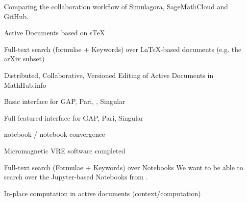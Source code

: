 \begin{workpackage}
\begin{tasklist}
\begin{task}[id=simulagora,title=Simulagora collaboration,lead=LL,PM=2]
  Comparing the collaboration workflow of Simulagora, SageMathCloud and GitHub.
\end{task}

\end{tasklist}

\begin{wpdelivs}
  \begin{wpdeliv}[id=adstex,due=6,nature=R,dissem=PU,lead=JU]
    {Active Documents based on sTeX}
  \end{wpdeliv}
    \begin{wpdeliv}[id=mws,due=9,nature=OTHER,dissem=PU,lead=JU]
      {Full-text search (formulae + Keywords) over LaTeX-based documents
        (e.g. the arXiv subset)}
    \end{wpdeliv}
    \begin{wpdeliv}[id=mathhub-editing,due=12,nature=DEM,dissem=PU,lead=JU]
      {Distributed, Collaborative, Versioned Editing of Active Documents in MathHub.info}
    \end{wpdeliv}
  \begin{wpdeliv}[due=12,id=ipython-kernels-basic,dissem=PU,nature=OTHER]
      {Basic \Jupyter interface for GAP, Pari, \Sage, Singular}
  \end{wpdeliv}
  \begin{wpdeliv}[due=12,id=ipython-kernels,dissem=PU,nature=OTHER]
      {Full featured \Jupyter interface for GAP, Pari, Singular}
  \end{wpdeliv}

  \begin{wpdeliv}[due=12,id=ipython-kernel-sage,dissem=PU,nature=DEM]
      {\Sage notebook / \Jupyter notebook convergence}
  \end{wpdeliv}

    \begin{wpdeliv}[due=15,id=oommf-nb,dissem=PU,nature=DEM,lead=USO]
      {Micromagnetic VRE software completed}
    \end{wpdeliv}

    \begin{wpdeliv}[id=notebooksearch,due=18,nature=OTHER,dissem=PU,lead=JU]
      {Full-text search (Formulae + Keywords) over Notebooks}
      We want to be able to search over the Jupyter-based Notebooks from
      .
\end{wpdeliv}
    \begin{wpdeliv}[id=adcomp,due=18,nature=DEM,dissem=PU,lead=JU]
      {In-place computation in active documents (context/computation)}
    \end{wpdeliv}


\end{wpdelivs}
\end{workpackage}
